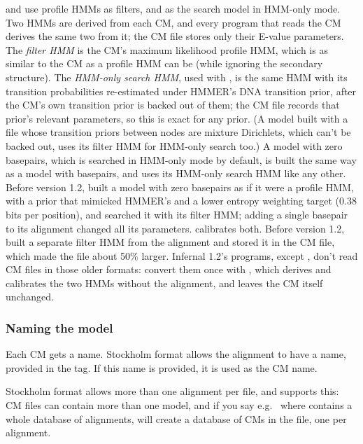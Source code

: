  and  use profile HMMs as filters, and as
the search model in HMM-only mode. Two HMMs are derived from each CM,
and every program that reads the CM derives the same two from it; the
CM file stores only their E-value parameters. The \emph{filter HMM} is
the CM's maximum likelihood profile HMM, which is as similar to the CM
as a profile HMM can be (while ignoring the secondary structure). The
\emph{HMM-only search HMM}, used with , is the same
HMM with its transition probabilities re-estimated under HMMER's DNA
transition prior, after the CM's own transition prior is backed out
of them; the CM file records that prior's relevant parameters, so this
is exact for any prior. (A model built with a  file
whose transition priors between  nodes are mixture
Dirichlets, which can't be backed out, uses its filter HMM for
HMM-only search too.) A model with zero basepairs, which is searched
in HMM-only mode by default, is built the same way as a model with
basepairs, and uses its HMM-only search HMM like any other. Before
version 1.2,  built a model with zero basepairs as if
it were a profile HMM, with a prior that mimicked HMMER's and a lower
entropy weighting target (0.38 bits per position), and searched it
with its filter HMM; adding a single basepair to its alignment changed
all its parameters.
 calibrates both. Before version 1.2, 
built a separate filter HMM from the alignment and stored it in the
CM file, which made the file about 50\% larger. Infernal 1.2's
programs, except , don't read CM files in those older
formats: convert them once with , which
derives and calibrates the two HMMs without the alignment, and leaves
the CM itself unchanged.

\subsubsection{Naming the model}

Each CM gets a name. Stockholm format allows the alignment to have a
name, provided in the  tag. If this name is provided,
it is used as the CM name.

Stockholm format allows more than one alignment per file, and
 supports this: CM files can contain more than one
model, and if you say e.g.\  where
 contains a whole database of alignments,
 will create a database of CMs in the  file,
one per alignment. 

